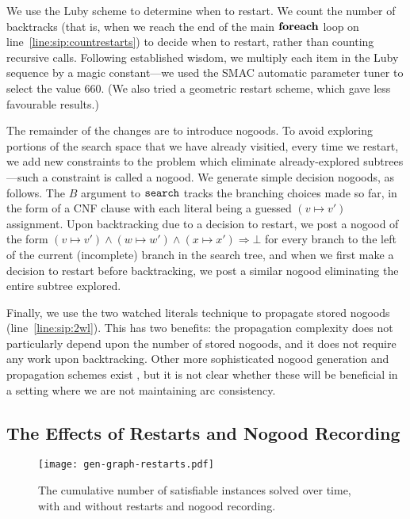 \documentclass[letterpaper]{article} %
\newcommand{\siplineref}[1]{line~\ref{line:sip:#1}}
\begin{document}
We use the Luby scheme \cite{DBLP:journals/ipl/LubySZ93} to determine when to restart. We count the
number of backtracks (that is, when we reach the end of the main $\KwSty{foreach}$ loop on
\siplineref{countrestarts}) to decide when to restart, rather than counting recursive calls.
Following established wisdom, we multiply each item in the Luby sequence by a magic constant---we
used the SMAC automatic parameter tuner \cite{DBLP:conf/lion/HutterHL11} to select the value 660.
(We also tried a geometric restart scheme, which gave less favourable results.)

The remainder of the changes are to introduce nogoods. To avoid exploring portions of the search
space that we have already visitied, every time we restart, we add new constraints to the problem
which eliminate already-explored subtrees---such a constraint is called a nogood. We generate simple
decision nogoods, as follows. The $B$ argument to $\FuncSty{search}$ tracks the branching choices
made so far, in the form of a CNF clause with each literal being a guessed $(v \mapsto v')$
assignment. Upon backtracking due to a decision to restart, we post a nogood of the form $(v \mapsto
v') \wedge (w \mapsto w') \wedge (x \mapsto x') \Rightarrow \bot$ for every branch to the left of
the current (incomplete) branch in the search tree, and when we first make a decision to restart
before backtracking, we post a similar nogood eliminating the entire subtree explored.

Finally, we use the two watched literals technique \cite{DBLP:conf/dac/MoskewiczMZZM01} to
propagate stored nogoods (\siplineref{2wl}). This has two benefits: the propagation complexity does
not particularly depend upon the number of stored nogoods, and it does not require any work upon
backtracking.  Other more sophisticated nogood generation and propagation schemes exist
\cite{DBLP:conf/aaai/LeeSZ16,DBLP:conf/cp/GlorianBLLM17}, but it is not clear whether these will be
beneficial in a setting where we are not maintaining arc consistency.

\subsection{The Effects of Restarts and Nogood Recording}

\begin{figure}[tb]
    \centering
    \texttt{[image: gen-graph-restarts.pdf]}

    \caption{The cumulative number of satisfiable instances solved over time, with and without
    restarts and nogood recording.}
    \label{figure:restarts}
\end{figure}
\end{document}
